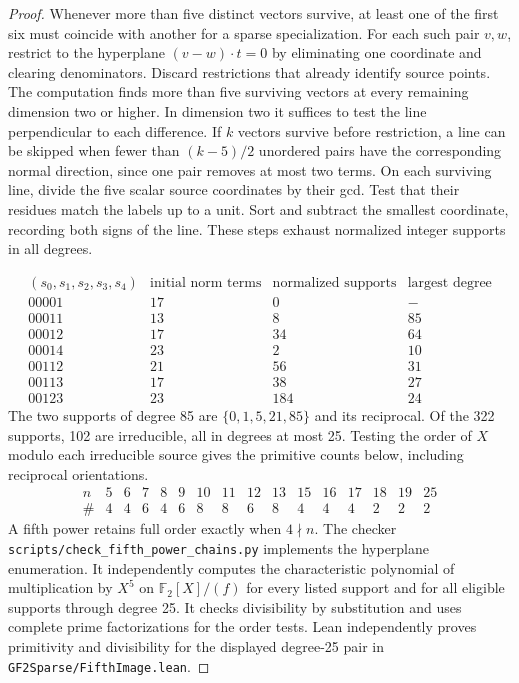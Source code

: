 \documentclass[11pt]{article}
\newcommand{\F}{\mathbb F_2}
\begin{document}
\begin{proof}
Whenever more than five distinct vectors survive, at least one of the
first six must coincide with another for a sparse specialization.
For each such pair \(v,w\), restrict to the hyperplane
\((v-w)\cdot t=0\) by eliminating one coordinate and clearing
denominators. Discard restrictions that already identify source
points. The computation finds more than five surviving vectors at
every remaining dimension two or higher. In dimension two it suffices
to test the line perpendicular to each difference. If \(k\) vectors
survive before restriction, a line can be skipped when fewer than
\((k-5)/2\) unordered pairs have the corresponding normal direction,
since one pair removes at most two terms. On each surviving line,
divide the five scalar source coordinates by their gcd. Test that
their residues match the labels up to a unit. Sort and subtract the
smallest coordinate, recording both signs of the line. These steps
exhaust normalized integer supports in all degrees.

\[
\begin{array}{c|r|r|r}
 (s_0,s_1,s_2,s_3,s_4)&\text{initial norm terms}
    &\text{normalized supports}&\text{largest degree}\\\hline
 00001&17&0&-\\
 00011&13&8&85\\
 00012&17&34&64\\
 00014&23&2&10\\
 00112&21&56&31\\
 00113&17&38&27\\
 00123&23&184&24
\end{array}
\]
The two supports of degree 85 are \(\{0,1,5,21,85\}\) and its
reciprocal. Of the 322 supports, 102 are irreducible, all in degrees
at most 25. Testing the order of \(X\) modulo each irreducible source
gives the primitive counts below, including reciprocal orientations.
\[
\begin{array}{c|rrrrrrrrrrrrrrr}
n&5&6&7&8&9&10&11&12&13&15&16&17&18&19&25\\\hline
\#&4&4&6&4&6&8&8&6&8&4&4&4&2&2&2
\end{array}
\]
A fifth power retains full order exactly when \(4\nmid n\).
The checker \nolinkurl{scripts/check_fifth_power_chains.py} implements
the hyperplane enumeration. It independently computes the characteristic
polynomial of multiplication by \(X^5\) on \(\F[X]/(f)\) for every
listed support and for all eligible supports through degree 25.
It checks divisibility by substitution and uses complete prime
factorizations for the order tests. Lean independently proves
primitivity and divisibility for the displayed degree-25 pair in
\nolinkurl{GF2Sparse/FifthImage.lean}.
\end{proof}
\end{document}
